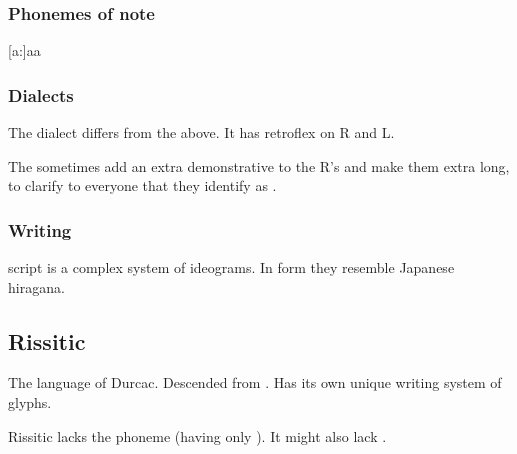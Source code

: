 




\begin{pronunciationenvironment}{\subsubsection{Phonemes of note}}
  \pitem{\ahresphan}   {[a:]}{aa}
  \pitem{\aflatresphan}{[\ae]}{\aumlaut}
\end{pronunciationenvironment}





\subsubsection{Dialects}
The \Mystraacht{} dialect differs from the above. 
It has retroflex on R and L. 

The \CiriathSepher{} sometimes add an extra demonstrative  to the R's and make them extra long, to clarify to everyone that they identify as \CiriathSepher. 





\subsubsection{Writing}
\Resphan{} script is a complex system of ideograms. 
In form they resemble Japanese hiragana. 









\subsection{Rissitic}
The language of Durcac. 
Descended from \Shurco{}. 
Has its own unique writing system of glyphs. 

Rissitic lacks the phoneme \txipa{[x]} (having only \txipa{[\c c]}). 
It might also lack \txipa{[l]}. 










